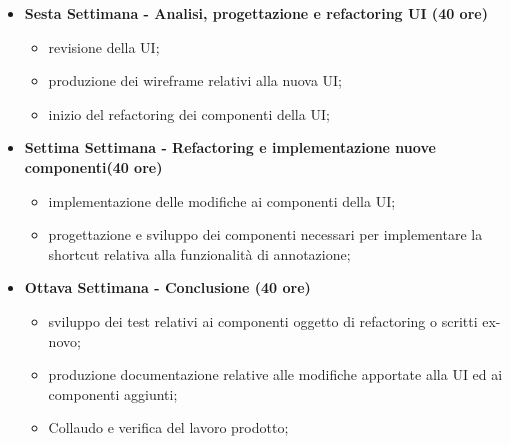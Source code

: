 {\begin{itemize}
\begin{itemize}
            \item definizione e scrittura dei test;
            \item produzione documentazione relativa alle modifiche apportate;
        \end{itemize}
        \item \textbf{Sesta Settimana - Analisi, progettazione e refactoring UI (40 ore)} 
        \begin{itemize}
            \item revisione della UI;
            \item produzione dei wireframe relativi alla nuova UI;
            \item inizio del refactoring dei componenti della UI;
        \end{itemize}
        \item \textbf{Settima Settimana - Refactoring e implementazione nuove componenti(40 ore)} 
        \begin{itemize}
            \item implementazione delle modifiche ai componenti della UI;
            \item progettazione e sviluppo dei componenti necessari per implementare la shortcut relativa alla funzionalità di annotazione;
        \end{itemize}
        \newpage
        \item \textbf{Ottava Settimana - Conclusione (40 ore)} 
        \begin{itemize}
            \item sviluppo dei test relativi ai componenti oggetto di refactoring o scritti ex-novo;
            \item produzione documentazione relative alle modifiche apportate alla UI ed ai componenti aggiunti;
            \item Collaudo e verifica del lavoro prodotto;
        \end{itemize}
    \end{itemize}
}

\newcommand{\totaleOre}{320}

\newcommand{\obiettiviObbligatori}{
	 \item \underline{\textit{O01}}: Deve essere eseguito il refactoring dei componenti che gestiscono le annotazioni;
	 \item \underline{\textit{O02}}: Deve essere rivista la collocazione e l'aspetto visivo delle toolbar per la navigazione del pdf con le varie annotazioni;
	 
}

\newcommand{\obiettiviDesiderabili}{
	 \item \underline{\textit{D01}}: Deve essere aggiunta una shortcut per l'attivazione della funzionalità di annotazione del pdf;
}

\newcommand{\obiettiviFacoltativi}{
	 \item \underline{\textit{F01}}: devono essre presenti dei test a livello di frontend;
}